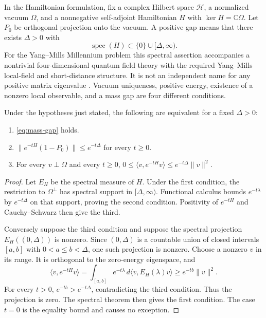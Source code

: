 In the Hamiltonian formulation, fix a complex Hilbert space $\mathcal H$,
a normalized vacuum $\Omega$, and a nonnegative self-adjoint Hamiltonian
$H$ with $\ker H=\mathbb C\Omega$.  Let $P_0$ be orthogonal
projection onto the vacuum.  A positive gap means that there exists
$\Delta>0$ with
\begin{equation}
 \operatorname{spec}(H)\subset\{0\}\cup[\Delta,\infty).
 \label{eq:mass-gap}
\end{equation}
For the Yang--Mills Millennium problem this spectral assertion accompanies
a nontrivial four-dimensional quantum field theory with the required
Yang--Mills local-field and short-distance structure.  It is not an
independent name for any positive matrix eigenvalue
\cite{JaffeWitten2006}.  Vacuum uniqueness, positive energy, existence of a
nonzero local observable, and a mass gap are four different conditions.

\begin{theorem}
Under the hypotheses just stated, the following are equivalent for a fixed
$\Delta>0$:
\begin{enumerate}
 \item \eqref{eq:mass-gap} holds.
 \item $\|e^{-tH}(1-P_0)\|\leq e^{-t\Delta}$ for every $t\geq0$.
 \item For every $v\perp\Omega$ and every $t\geq0$,
 $0\leq\langle v,e^{-tH}v\rangle\leq e^{-t\Delta}\|v\|^2$.
\end{enumerate}
\end{theorem}

\begin{proof}
Let $E_H$ be the spectral measure of $H$.  Under the first condition,
the restriction to $\Omega^\perp$ has spectral support in
$[\Delta,\infty)$.  Functional calculus bounds
$e^{-t\lambda}$ by $e^{-t\Delta}$ on that support, proving the
second condition.  Positivity of $e^{-tH}$ and Cauchy--Schwarz then give
the third.

Conversely suppose the third condition and suppose the spectral projection
$E_H((0,\Delta))$ is nonzero.  Since $(0,\Delta)$ is a countable
union of closed intervals $[a,b]$ with $0<a\leq b<\Delta$, one such
projection is nonzero.  Choose a nonzero $v$ in its range.  It is
orthogonal to the zero-energy eigenspace, and
\[
 \langle v,e^{-tH}v\rangle
 =\int_{[a,b]}e^{-t\lambda}\,d\langle v,E_H(\lambda)v\rangle
 \geq e^{-tb}\|v\|^2.
\]
For every $t>0$, $e^{-tb}>e^{-t\Delta}$, contradicting the third
condition.  Thus the projection is zero.  The spectral theorem then gives
the first condition.  The case $t=0$ is the equality bound and causes no
exception.
\end{proof}

